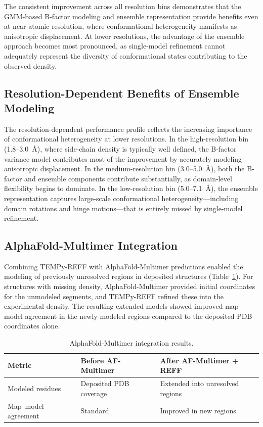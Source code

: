 \documentclass[11pt]{article}
\begin{document}
The consistent improvement across all resolution bins demonstrates that the GMM-based B-factor modeling and ensemble representation provide benefits even at near-atomic resolution, where conformational heterogeneity manifests as anisotropic displacement. At lower resolutions, the advantage of the ensemble approach becomes most pronounced, as single-model refinement cannot adequately represent the diversity of conformational states contributing to the observed density.

\subsection{Resolution-Dependent Benefits of Ensemble Modeling}

The resolution-dependent performance profile reflects the increasing importance of conformational heterogeneity at lower resolutions. In the high-resolution bin (1.8--3.0~\AA{}), where side-chain density is typically well defined, the B-factor variance model contributes most of the improvement by accurately modeling anisotropic displacement. In the medium-resolution bin (3.0--5.0~\AA{}), both the B-factor and ensemble components contribute substantially, as domain-level flexibility begins to dominate. In the low-resolution bin (5.0--7.1~\AA{}), the ensemble representation captures large-scale conformational heterogeneity---including domain rotations and hinge motions---that is entirely missed by single-model refinement.

\subsection{AlphaFold-Multimer Integration}

Combining TEMPy-REFF with AlphaFold-Multimer predictions enabled the modeling of previously unresolved regions in deposited structures (Table~\ref{tab:af}). For structures with missing density, AlphaFold-Multimer provided initial coordinates for the unmodeled segments, and TEMPy-REFF refined these into the experimental density. The resulting extended models showed improved map--model agreement in the newly modeled regions compared to the deposited PDB coordinates alone.

\begin{table}[ht]
\centering
\caption{AlphaFold-Multimer integration results.}
\label{tab:af}
\begin{tabular}{lll}
\toprule
\textbf{Metric} & \textbf{Before AF-Multimer} & \textbf{After AF-Multimer + REFF} \\
\midrule
Modeled residues & Deposited PDB coverage & Extended into unresolved regions \\
Map--model agreement & Standard & Improved in new regions \\
\bottomrule
\end{tabular}
\end{table}
\end{document}
